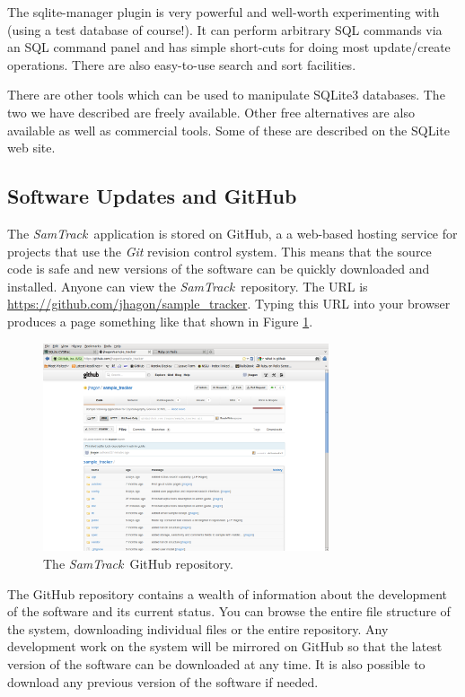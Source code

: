 \documentclass[12pt,twoside]{article}
\newcommand{\samtrack}{\emph{SamTrack}}
\begin{document}
The sqlite-manager plugin is very powerful and well-worth experimenting
with (using a test database of course!). It can perform arbitrary SQL
commands via an SQL command panel and has simple short-cuts for doing
most update/create operations. There are also easy-to-use search and sort
facilities.

There are other tools which can be used to manipulate SQLite3 databases.
The two we have described are freely available. Other free alternatives
are also available as well as commercial tools. Some of these are described
on the SQLite web site.

\subsection{Software Updates and GitHub}\label{sec:github}
The \samtrack\ application is stored on GitHub\cite{github}, a
a web-based hosting service for projects that use the 
\emph{Git} revision control system.
This means that the source code is safe and new versions of the
software can be quickly downloaded and installed.
Anyone can view the \samtrack\ repository. 
The URL is \url{https://github.com/jhagon/sample_tracker}.
Typing this URL into your browser produces a page something like that
shown in Figure \ref{fig:github1}.

\begin{figure}[!htb]
\begin{center}
\includegraphics[width=0.75\textwidth]{github1}
\caption{The \samtrack\ GitHub repository.\label{fig:github1}}
\end{center}
\end{figure}

The GitHub repository contains a wealth of information about the
development of the software and its current status. You can browse
the entire file structure of the system, downloading individual files
or the entire repository. Any development work on the system will be
mirrored on GitHub so that the latest version of the software can be
downloaded at any time. It is also possible to download any previous
version of the software if needed.
\end{document}
